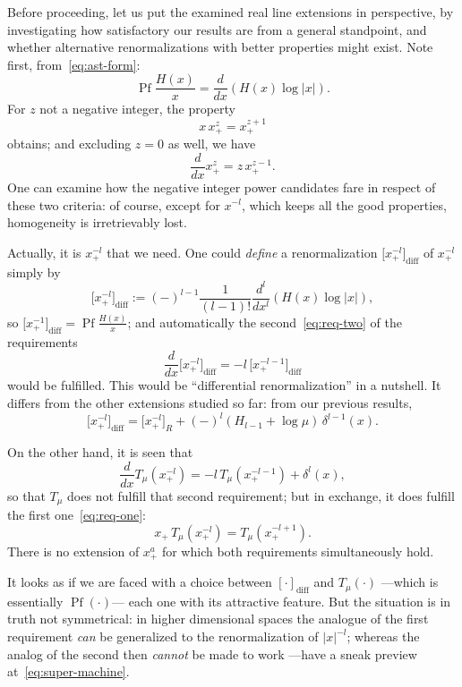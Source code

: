 \documentclass[a4paper,12pt]{article}
\newcommand{\diff}{{\mathrm{diff}}} %
\newcommand{\dl}{\delta}           %
\DeclareMathOperator{\Pf}{Pf}      %
\newcommand{\7}{\dagger}           %
\theoremstyle{plain}
\theoremstyle{definition}
\begin{document}
Before proceeding, let us put the examined real line extensions in
perspective, by investigating how satisfactory our results are from a
general standpoint, and whether alternative renormalizations with
better properties might exist. Note first, from~\eqref{eq:ast-form}:
$$
\Pf \frac{H(x)}{x} = \frac{d}{dx} (H(x) \log|x|).
$$
For $z$ not a negative integer, the property
\begin{equation}
x\,x_+^z = x_+^{z+1}
\label{eq:req-one}
\end{equation}
obtains; and excluding $z = 0$ as well, we have
\begin{equation}
\frac{d}{dx} x_+^z = z\,x_+^{z-1}.
\label{eq:req-two}
\end{equation}
One can examine how the negative integer power candidates fare in
respect of these two criteria: of course, except for $x^{-l}$, which
keeps all the good properties, homogeneity is irretrievably lost.

Actually, it is $x_+^{-l}$ that we need. One could \textit{define} a
renormalization $\bigl[x_+^{-l}\bigr]_\diff$ of $x_+^{-l}$ simply by
$$
\bigl[x_+^{-l}\bigr]_\diff :=
(-)^{l-1} \frac{1}{(l-1)!} \frac{d^l}{dx^l} (H(x) \log|x|),
$$
so $\bigl[x_+^{-1}\bigr]_\diff = \Pf \frac{H(x)}{x}$; and
automatically the second~\eqref{eq:req-two} of the requirements
$$
\frac{d}{dx} \bigl[x_+^{-l}\bigr]_\diff =
-l\,\bigl[x_+^{-l-1}\bigr]_\diff
$$
would be fulfilled. This would be ``differential renormalization'' in
a nutshell. It differs from the other extensions studied so far: from
our previous results,
$$
\bigl[x_+^{-l}\bigr]_\diff = \bigl[x_+^{-l}\bigr]_R
+ (-)^l (H_{l-1} + \log\mu) \,\dl^{l-1}(x).
$$

On the other hand, it is seen that
$$
\frac{d}{dx} T_\mu(x_+^{-l}) = -l\,T_\mu(x_+^{-l-1}) + \dl^l(x),
$$
so that $T_\mu$ does not fulfill that second requirement; but in
exchange, it does fulfill the first one~\eqref{eq:req-one}:
$$
x_+\,T_\mu(x_+^{-l}) = T_\mu(x_+^{-l+1}).
$$
There is no extension of $x_+^a$ for which both requirements
simultaneously hold.

It looks as if we are faced with a choice between $[\cdot]_\diff$ and
$T_\mu(\cdot)$ ---which is essentially $\Pf(\cdot)$--- each one with
its attractive feature. But the situation is in truth not symmetrical:
in higher dimensional spaces the analogue of the first requirement
\textit{can} be generalized to the renormalization of $|x|^{-l}$;
whereas the analog of the second then \textit{cannot} be made to work
---have a sneak preview at~\eqref{eq:super-machine}.
\end{document}
